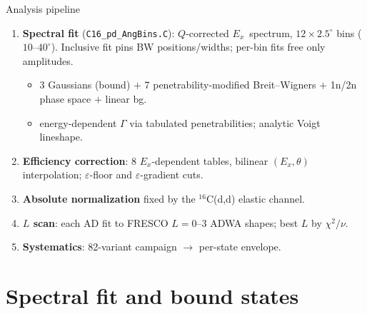 \documentclass[aspectratio=169,11pt]{beamer}
\newcommand{\Cs}{$^{16}$C}
\newcommand{\chinu}{$\chi^2/\nu$}
\newcommand{\Ex}{$E_x$}
\begin{document}
\begin{frame}{Analysis pipeline}
  \begin{enumerate}
    \item \textbf{Spectral fit} (\texttt{C16\_pd\_AngBins.C}): $Q$-corrected \Ex\
      spectrum, $12\times2.5^\circ$ bins ($10$--$40^\circ$).
      Inclusive fit pins BW positions/widths; per-bin fits free only amplitudes.
      \begin{itemize}\small
        \item 3 Gaussians (bound) $+$ 7 penetrability-modified Breit--Wigners
              $+$ 1n/2n phase space $+$ linear bg.
        \item energy-dependent $\Gamma$ via tabulated penetrabilities; analytic
              Voigt lineshape.
      \end{itemize}
    \item \textbf{Efficiency correction}: 8 \Ex-dependent tables, bilinear
      $(E_x,\theta)$ interpolation; $\varepsilon$-floor and $\varepsilon$-gradient cuts.
    \item \textbf{Absolute normalization} fixed by the \Cs(d,d) elastic channel.
    \item \textbf{$L$ scan}: each AD fit to FRESCO $L=0$--$3$ ADWA shapes; best $L$
      by \chinu.
    \item \textbf{Systematics}: 82-variant campaign $\rightarrow$ per-state envelope.
  \end{enumerate}
\end{frame}

\section{Spectral fit and bound states}
\end{document}

